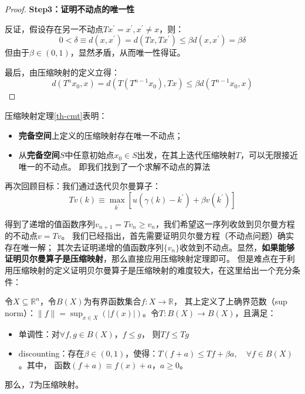 \begin{proof}
    \textbf{Step3：证明不动点的唯一性}

    反证，假设存在另一不动点$Tx^{\prime}=x^{\prime},x^{\prime} \neq x$，则：
    $$
    0<\delta \equiv d\left(x,x^{\prime}\right)=d\left(Tx,Tx^{\prime}\right)\leq \beta d\left(x,x^{\prime}\right)=\beta \delta
    $$
    但由于$\beta \in \left(0,1\right)$，显然矛盾，从而唯一性得证。

    最后，由压缩映射的定义立得：
    $$
    d\left(T^nx_0,x\right) = d\left(T\left(T^{n-1}x_0\right),Tx\right) \leq \beta d\left(T^{n-1}x_0,x\right)
    $$
\end{proof}

压缩映射定理\ref{th-cmt}表明：
\begin{itemize}
    \item \textbf{完备空间}上定义的压缩映射存在唯一不动点；
    \item 从\textbf{完备空间}$S$中任意初始点$x_0 \in S$出发，在其上迭代压缩映射$T$，可以无限接近唯一的不动点。
        即我们找到了一个求解不动点的算法
\end{itemize}

再次回顾目标：我们通过迭代贝尔曼算子：
\begin{equation*}
    Tv\left(k\right) 
        \equiv \max_{k^{\prime}} \left[u\left(\gamma\left(k\right)-k^{\prime}\right)+\beta v\left(k^{\prime}\right)\right]
\end{equation*}

得到了递增的值函数序列$v_{n+1}=Tv_n \geq v_n$，我们希望这一序列收敛到贝尔曼方程的不动点$v=Tv$。
我们已经指出，首先需要证明贝尔曼方程（不动点问题）确实存在唯一解；
其次去证明递增的值函数序列$\{v_n\}$收敛到不动点。显然，\textbf{如果能够证明贝尔曼算子是压缩映射}，那么直接应用压缩映射定理即可。
但是难点在于利用压缩映射的定义证明贝尔曼算子是压缩映射的难度较大，在这里给出一个充分条件：
\begin{theorem}[Blackwell充分条件]  \label{th-blackwell}
    令$X \subseteq \mathbb{R}^n$，令$B(X)$为有界函数集合$f: X \rightarrow \mathbb{R}$，
    其上定义了上确界范数（sup norm）：$\|f\|=\sup _{x \in X}(|f(x)|)$。令$T:B\left(X\right)\rightarrow B\left(X\right)$，且满足：
    \begin{itemize}
        \item 单调性：对$\forall f, g \in B(X)$，$f \leq g$， 则$T f \leq T g$
        \item discounting：存在$\beta \in \left(0,1\right)$，使得：$T(f+a) \leq T f+\beta a, \quad \forall f \in B(X)$。其中，
            函数$\left(f+a\right)\equiv f\left(x\right)+a$，$a \geq 0$。
    \end{itemize}
    那么，$T$为压缩映射。
\end{theorem}

